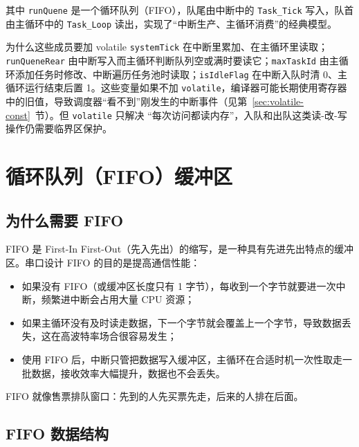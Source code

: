 其中 \texttt{runQuene} 是一个循环队列（FIFO），队尾由中断中的 \texttt{Task\_Tick} 写入，队首由主循环中的 \texttt{Task\_Loop} 读出，实现了“中断生产、主循环消费”的经典模型。

\begin{anybox}{为什么这些成员要加 volatile}
\texttt{systemTick} 在中断里累加、在主循环里读取；\texttt{runQueneRear} 由中断写入而主循环判断队列空或满时要读它；\texttt{maxTaskId} 由主循环添加任务时修改、中断遍历任务池时读取；\texttt{isIdleFlag} 在中断入队时清 0、主循环运行结束后置 1。这些变量如果不加 \texttt{volatile}，编译器可能长期使用寄存器中的旧值，导致调度器“看不到”刚发生的中断事件（见第~\ref{sec:volatile-const}~节）。但 \texttt{volatile} 只解决 “每次访问都读内存”，入队和出队这类读-改-写操作仍需要临界区保护。


\end{anybox}
\section{循环队列（FIFO）缓冲区}

\subsection{为什么需要 FIFO}

FIFO 是 First-In First-Out（先入先出）的缩写，是一种具有先进先出特点的缓冲区。串口设计 FIFO 的目的是提高通信性能：

\begin{itemize}
\item 如果没有 FIFO（或缓冲区长度只有 1 字节），每收到一个字节就要进一次中断，频繁进中断会占用大量 CPU 资源；
\item 如果主循环没有及时读走数据，下一个字节就会覆盖上一个字节，导致数据丢失，这在高波特率场合很容易发生；
\item 使用 FIFO 后，中断只管把数据写入缓冲区，主循环在合适时机一次性取走一批数据，接收效率大幅提升，数据也不会丢失。
\end{itemize}

FIFO 就像售票排队窗口：先到的人先买票先走，后来的人排在后面。

\subsection{FIFO 数据结构}

